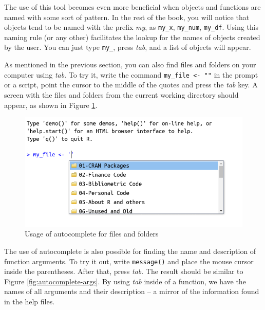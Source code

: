 \documentclass[
  12pt,
]{book}
\begin{document}
The use of this tool becomes even more beneficial when objects and functions are named with some sort of pattern. In the rest of the book, you will notice that objects tend to be named with the prefix \emph{my}, as \texttt{my\_x}, \texttt{my\_num}, \texttt{my\_df}. Using this naming rule (or any other) facilitates the lookup for the names of objects created by the user. You can just type \texttt{my\_}, press \emph{tab}, and a list of objects will appear.

As mentioned in the previous section, you can also find files and folders on your computer using \emph{tab}. To try it, write the command \texttt{my\_file\ \textless{}-\ ""} in the prompt or a script, point the cursor to the middle of the quotes and press the \emph{tab} key. A screen with the files and folders from the current working directory should appear, as shown in Figure \ref{fig:autocomplete-files}.

\begin{figure}[!htbp]

{\centering \includegraphics[width=1\linewidth]{figs/autocomplete_files} 

}

\caption{Usage of autocomplete for files and folders}\label{fig:autocomplete-files}
\end{figure}

The use of autocomplete is also possible for finding the name and description of function arguments. To try it out, write \texttt{message()} and place the mouse cursor inside the parentheses. After that, press \emph{tab}. The result should be similar to Figure \ref{fig:autocomplete-args}. By using \emph{tab} inside of a function, we have the names of all arguments and their description -- a mirror of the information found in the help files.
\end{document}
